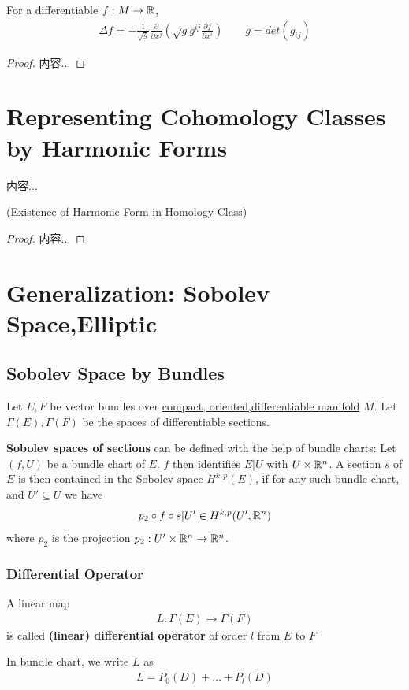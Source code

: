 \documentclass[Total.tex]{subfiles}
\begin{document}
				\begin{proposition}
					For a differentiable $f:M\rightarrow \mathbb{R}$,
					\begin{gather*}
						\Delta f=-\frac{1}{\sqrt{g}}\frac{\partial}{\partial x^j}(\sqrt{g}g^{ij}\frac{\partial f}{\partial x^i})\qquad g=det(g_{ij})
					\end{gather*}
				\end{proposition}
				\begin{proof}
					内容...
				\end{proof}
		\section{Representing Cohomology Classes by Harmonic Forms}
			\begin{Def}
				内容...
			\end{Def}
			
			\begin{theorem}
				(Existence of Harmonic Form in Homology Class)
			\end{theorem}
			\begin{proof}
				内容...
			\end{proof}
		\section{Generalization: Sobolev Space,Elliptic}
			\subsection{Sobolev Space by Bundles}
				\begin{Def}
					Let $E,F$ be vector bundles over \underline{compact, oriented,differentiable manifold} $M$. Let $\Gamma(E),\Gamma(F)$ be the spaces of differentiable sections.
					
					\textbf{Sobolev spaces of sections} can be defined with the help of bundle charts: Let $(f,U)$ be a bundle chart of $E$. $f$ then identifies $E|U$ with $U\times \mathbb{R}^n$. A section $s$ of $E$ is then contained in the Sobolev space $H^{k,p}(E)$, if for any such bundle chart, and $U'\subseteq U$ we have
					\begin{gather*}
						p_2\circ f\circ s|U'\in H^{k,p}(U',\mathbb{R}^n)
					\end{gather*}  
					where $p_2$ is the projection $p_2:U'\times \mathbb{R}^n\rightarrow \mathbb{R}^n$.
				\end{Def}
				
				\subsubsection{Differential Operator}
				\begin{Def}
					A linear map
					\begin{gather*}
						L:\Gamma(E)\rightarrow \Gamma(F)
					\end{gather*}
					is called \textbf{(linear) differential operator} of order $l$ from $E$ to $F$
					
					In bundle chart, we write $L$ as 
					\begin{gather*}
						L=P_0(D)+\dots+P_l(D)
					\end{gather*}
				\end{Def}
\end{document}

